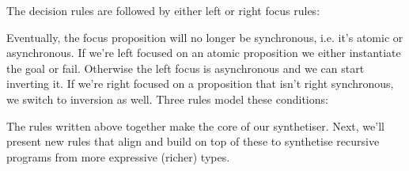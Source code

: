 \documentclass{llncs}
\newcommand{\lolli}{\multimap}
\newcommand{\tensor}{\otimes}
\newcommand{\bang}{{!}}
\begin{document}
The decision rules are followed by either left or right focus rules:
%
Eventually, the focus proposition will no longer be synchronous, i.e. it's
atomic or asynchronous. If we're left focused on an atomic proposition we either
instantiate the goal or fail. Otherwise the left focus is asynchronous and we
can start inverting it. If we're right focused on a proposition that isn't right
synchronous, we switch to inversion as well. Three rules model these conditions:
%
The rules written above together make the core of our synthetiser. Next, we'll
present new rules that align and build on top of these to synthetise recursive
programs from more expressive (richer) types.
\end{document}
